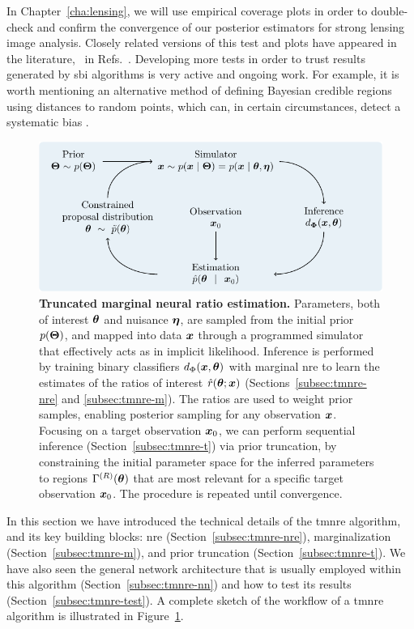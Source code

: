In Chapter~\ref{cha:lensing}, we will use empirical coverage plots in order to double-check and confirm the convergence of our posterior estimators for strong lensing image analysis. Closely related versions of this test and plots have appeared in the literature, \eg~in Refs.~\cite{Dax:2021tsq,Karchev:2022xyn, Bhardwaj:2023xph}. Developing more tests in order to trust results generated by \gls*{sbi} algorithms is very active and ongoing work. For example, it is worth mentioning an alternative method of defining Bayesian credible regions using distances to random points, which can, in certain circumstances, detect a systematic bias \cite{lemos2023sampling}.

\begin{figure}
	\centering
	\includegraphics[width=\linewidth]{TikZ/tmnre.pdf}
	\caption{\textbf{Truncated marginal neural ratio estimation.} Parameters, both of interest $\bm{\theta}$ and nuisance $\bm{\eta}$, are sampled from the initial prior $p(\bm{\Theta})$, and mapped into data $\bm{x}$ through a programmed simulator that effectively acts as in implicit likelihood. Inference is performed by training binary classifiers $d_\Phi(\bm{x}, \bm{\theta})$ with marginal \gls*{nre} to learn the estimates of the ratios of interest $\hat{r}(\bm{\theta};\bm{x})$ (Sections~\ref{subsec:tmnre-nre} and \ref{subsec:tmnre-m}). The ratios are used to weight prior samples, enabling posterior sampling for any observation $\bm{x}$. Focusing on a target observation $\bm{x}_0$, we can perform sequential inference (Section~\ref{subsec:tmnre-t}) via prior truncation, by constraining the initial parameter space for the inferred parameters to regions $\Gamma^{(R)}(\bm{\theta})$ that are most relevant for a specific target observation $\bm{x}_0$. The procedure is repeated until convergence.
}
	\label{fig:sbi-tmnre}
\end{figure}

In this section we have introduced the technical details of the \gls*{tmnre} algorithm, and its key building blocks: \gls*{nre} (Section~\ref{subsec:tmnre-nre}), marginalization  (Section~\ref{subsec:tmnre-m}), and prior truncation  (Section~\ref{subsec:tmnre-t}). We have also seen the general network architecture that is usually employed within this algorithm (Section~\ref{subsec:tmnre-nn}) and how to test its results (Section~\ref{subsec:tmnre-test}). A complete sketch of the workflow of a \gls*{tmnre} algorithm is illustrated in Figure~\ref{fig:sbi-tmnre}.


